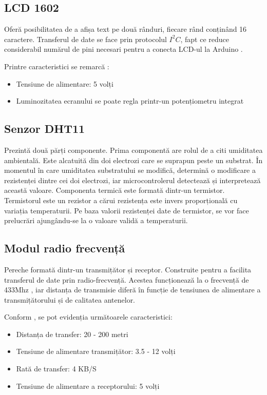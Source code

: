 \subsection{LCD 1602}

	Oferă posibilitatea de a afișa text pe două rânduri, fiecare rând conținând 16 caractere. Transferul de date se face prin protocolul $I^2C$, fapt ce reduce considerabil numărul de pini necesari pentru a conecta LCD-ul la Arduino \cite{lcd}.

\vspace{1em}

	Printre caracteristici se remarcă \cite{lcd}:
 		\begin{itemize}
			\setlength{\itemindent}{2em}
			\itemsep0em
			\item Tensiune de alimentare: 5 volți 
			\item Luminozitatea ecranului se poate regla printr-un potențiometru integrat
		\end{itemize} 
	
\subsection{Senzor DHT11}

	Prezintă două părți componente. Prima componentă are rolul de a citi umiditatea ambientală. Este alcatuită din doi electrozi care se suprapun peste un substrat. În momentul în care umiditatea substratului se modifică, determină o modificare a rezistenței dintre cei doi electrozi, iar microcontrolerul detectează și interpretează această valoare. Componenta termică este formată dintr-un termistor. Termistorul este un rezistor a cărui rezistența este invers proporțională cu variația temperaturii. Pe baza valorii rezistenței date de termistor, se vor face prelucrări ajungându-se la o valoare validă a temperaturii.

\subsection{Modul radio frecvență}

	Pereche formată dintr-un transmițător și receptor. Construite pentru a facilita transferul de date prin radio-frecvență. Acestea funcționează la o frecvență de 433Mhz \cite{rfModule}, iar distanța de transmisie diferă în funcție de tensiunea de alimentare a transmițătorului și de calitatea antenelor.

	Conform \cite{rfModule}, se pot evidenția următoarele caracteristici:
 		\begin{itemize}
			\setlength{\itemindent}{2em}
			\itemsep0em
			\item Distanța de transfer: 20 - 200 metri
			\item Tensiune de alimentare transmițător: 3.5 - 12 volți
			\item Rată de transfer: 4 KB/S
			\item Tensiune de alimentare a receptorului: 5 volți
		\end{itemize} 

